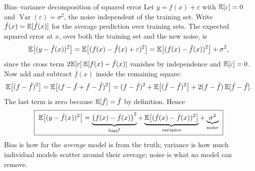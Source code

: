\begin{derivation}{Bias--variance decomposition of squared error}
Let $y = f(x) + \varepsilon$ with $\mathbb{E}[\varepsilon] = 0$ and
$\operatorname{Var}(\varepsilon) = \sigma^2$, the noise independent of the
training set. Write $\bar f(x) = \mathbb{E}[\hat f(x)]$ for the average prediction
over training sets. The expected squared error at $x$, over both the training
set and the new noise, is
\[
  \mathbb{E}\bigl[(y - \hat f(x))^2\bigr]
  = \mathbb{E}\bigl[(f(x) - \hat f(x) + \varepsilon)^2\bigr]
  = \mathbb{E}\bigl[(f(x) - \hat f(x))^2\bigr] + \sigma^2 ,
\]
since the cross term $2\mathbb{E}[\varepsilon]\,\mathbb{E}[f(x) - \hat f(x)]$ vanishes by
independence and $\mathbb{E}[\varepsilon] = 0$. Now add and subtract $\bar f(x)$
inside the remaining square:
\[
  \mathbb{E}\bigl[(f - \hat f)^2\bigr]
  = \mathbb{E}\bigl[(f - \bar f + \bar f - \hat f)^2\bigr]
  = (f - \bar f)^2 + \mathbb{E}\bigl[(\bar f - \hat f)^2\bigr]
    + 2(f - \bar f)\,\mathbb{E}[\bar f - \hat f] .
\]
The last term is zero because $\mathbb{E}[\hat f] = \bar f$ by definition. Hence
\[
  \boxed{\;\mathbb{E}\bigl[(y - \hat f(x))^2\bigr]
  = \underbrace{\bigl(f(x) - \bar f(x)\bigr)^2}_{\text{bias}^2}
  + \underbrace{\mathbb{E}\bigl[(\hat f(x) - \bar f(x))^2\bigr]}_{\text{variance}}
  + \underbrace{\sigma^2}_{\text{noise}}\;}
\]
Bias is how far the \emph{average} model is from the truth; variance is how much
individual models scatter around their average; noise is what no model can
remove.
\end{derivation}

